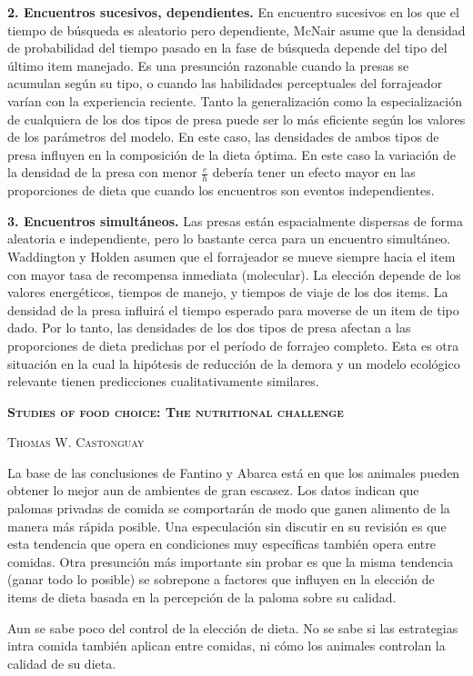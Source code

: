\documentclass[a4paper,12pt]{article}
\begin{document}
{\bfseries 2. Encuentros sucesivos, dependientes.} En encuentro sucesivos en los que el tiempo de búsqueda es aleatorio pero dependiente, McNair asume que la densidad de probabilidad del tiempo pasado en la fase de búsqueda depende del tipo del último item manejado. Es una presunción razonable cuando la presas se acumulan según su tipo, o cuando las habilidades perceptuales del forrajeador varían con la experiencia reciente. Tanto la generalización como la especialización de cualquiera de los dos tipos de presa puede ser lo más eficiente según los valores de los parámetros del modelo. En este caso, las densidades de ambos tipos de presa influyen en la composición de la dieta óptima. En este caso la variación de la densidad de la presa con menor $\frac{e}{h}$ debería tener un efecto mayor en las proporciones de dieta que cuando los encuentros son eventos independientes.

{\bfseries 3. Encuentros simultáneos.} Las presas están espacialmente dispersas de forma aleatoria e independiente, pero lo bastante cerca para un encuentro simultáneo. Waddington y Holden asumen que el forrajeador se mueve siempre hacia el item con mayor tasa de recompensa inmediata (molecular). La elección depende de los valores energéticos, tiempos de manejo, y tiempos de viaje de los dos items. La densidad de la presa influirá el tiempo esperado para moverse de un item de tipo dado. Por lo tanto, las densidades de los dos tipos de presa afectan a las proporciones de dieta predichas por el período de forrajeo completo. Esta es otra situación en la cual la hipótesis de reducción de la demora y un modelo ecológico relevante tienen predicciones cualitativamente similares.

{\scshape\bfseries Studies of food choice: The nutritional challenge}

{\scshape Thomas W. Castonguay}

La base de las conclusiones de Fantino y Abarca está en que los animales pueden obtener lo mejor aun de ambientes de gran escasez. Los datos indican que palomas privadas de comida se comportarán de modo que ganen alimento de la manera más rápida posible. Una especulación sin discutir en su revisión es que esta tendencia que opera en condiciones muy específicas también opera entre comidas. Otra presunción más importante sin probar es que la misma tendencia (ganar todo lo posible) se sobrepone a factores que influyen en la elección de items de dieta basada en la percepción de la paloma sobre su calidad.

Aun se sabe poco del control de la elección de dieta. No se sabe si las estrategias intra comida también aplican entre comidas, ni cómo los animales controlan la calidad de su dieta. 
\end{document}
